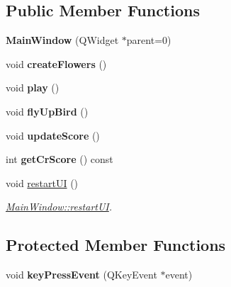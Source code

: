\subsection*{Public Member Functions}
\begin{DoxyCompactItemize}
\item 
\hypertarget{class_main_window_a8b244be8b7b7db1b08de2a2acb9409db}{}{\bfseries Main\+Window} (Q\+Widget $\ast$parent=0)\label{class_main_window_a8b244be8b7b7db1b08de2a2acb9409db}

\item 
\hypertarget{class_main_window_afc7af89bdb376772f2d61dec19ae1f82}{}void {\bfseries create\+Flowers} ()\label{class_main_window_afc7af89bdb376772f2d61dec19ae1f82}

\item 
\hypertarget{class_main_window_a4f035b25b6181829a9275155e3ca9bbd}{}void {\bfseries play} ()\label{class_main_window_a4f035b25b6181829a9275155e3ca9bbd}

\item 
\hypertarget{class_main_window_afa31474b493ee6d8847fdd6cbafd88a2}{}void {\bfseries fly\+Up\+Bird} ()\label{class_main_window_afa31474b493ee6d8847fdd6cbafd88a2}

\item 
\hypertarget{class_main_window_ac433c09c359ac237755e2266c4e0f76c}{}void {\bfseries update\+Score} ()\label{class_main_window_ac433c09c359ac237755e2266c4e0f76c}

\item 
\hypertarget{class_main_window_a4f4f4c634d8d1d1e46059ba7dd5648c6}{}int {\bfseries get\+Cr\+Score} () const \label{class_main_window_a4f4f4c634d8d1d1e46059ba7dd5648c6}

\item 
\hypertarget{class_main_window_a01a798332112e079bb1afab732318fb1}{}void \hyperlink{class_main_window_a01a798332112e079bb1afab732318fb1}{restart\+U\+I} ()\label{class_main_window_a01a798332112e079bb1afab732318fb1}

\begin{DoxyCompactList}\small\item\em \hyperlink{class_main_window_a01a798332112e079bb1afab732318fb1}{Main\+Window\+::restart\+U\+I}. \end{DoxyCompactList}\end{DoxyCompactItemize}
\subsection*{Protected Member Functions}
\begin{DoxyCompactItemize}
\item 
\hypertarget{class_main_window_a9c4f542263838b9ecd06eae839a42a34}{}void {\bfseries key\+Press\+Event} (Q\+Key\+Event $\ast$event)\label{class_main_window_a9c4f542263838b9ecd06eae839a42a34}

\end{DoxyCompactItemize}


